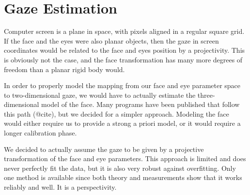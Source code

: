 \section{Gaze Estimation}

Computer screen is a plane in space, with pixels aligned in a regular square grid.
If the face and the eyes were also planar objects, then the gaze in screen coordinates would be related to the face and eyes position by a projectivity.
This is obviously not the case, and the face transformation has many more degrees of freedom than a planar rigid body would.
 
In order to properly model the mapping from our face and eye parameter space to two-dimensional gaze, we would have to actually estimate the three-dimensional model of the face.
Many programs have been published that follow this path (@cite), but we decided for a simpler approach.
Modeling the face would either require us to provide a strong a priori model, or it would require a longer calibration phase.

We decided to actually assume the gaze to be given by a projective transformation of the face and eye parameters.
This approach is limited and does never perfectly fit the data, but it is also very robust against overfitting. 
Only one method is available since both theory and measurements show that it works reliably and well.
It is a perspectivity.
\todo{\dots}
